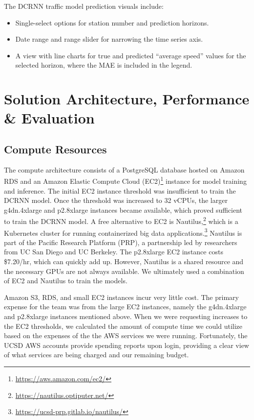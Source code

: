 \documentclass{article}
\begin{document}
The DCRNN traffic model prediction visuals include:
\begin{itemize}
    \item Single-select options for station number and prediction horizons. 
    \item Date range and range slider for narrowing the time series axis. 
    \item A view with line charts for true and predicted ``average speed'' values for the selected horizon, where the MAE is included in the legend.
\end{itemize}

\section{Solution Architecture, Performance \& Evaluation}

\subsection{Compute Resources}

The compute architecture consists of a PostgreSQL database hosted on Amazon RDS and an Amazon Elastic Compute Cloud (EC2)\footnote{\url{https://aws.amazon.com/ec2/}} instance for model training and inference. The initial EC2 instance threshold was insufficient to train the DCRNN model. Once the threshold was increased to 32 vCPUs, the larger g4dn.4xlarge and p2.8xlarge instances became available, which proved sufficient to train the DCRNN model. A free alternative to EC2 is Nautilus,\footnote{\url{https://nautilus.optiputer.net/}} which is a Kubernetes cluster for running containerized big data applications.\footnote{\url{https://ucsd-prp.gitlab.io/nautilus/}} Nautilus is part of the Pacific Research Platform (PRP), a partnership led by researchers from UC San Diego and UC Berkeley. The p2.8xlarge EC2 instance costs \$7.20/hr, which can quickly add up. However, Nautilus is a shared resource and the necessary GPUs are not always available. We ultimately used a combination of EC2 and Nautilus to train the models.

Amazon S3, RDS, and small EC2 instances incur very little cost. The primary expense for the team was from the large EC2 instances, namely the g4dn.4xlarge and p2.8xlarge instances mentioned above. When we were requesting increases to the EC2 thresholds, we calculated the amount of compute time we could utilize based on the expenses of the the AWS services we were running. Fortunately, the UCSD AWS accounts provide spending reports upon login, providing a clear view of what services are being charged and our remaining budget.
\end{document}
